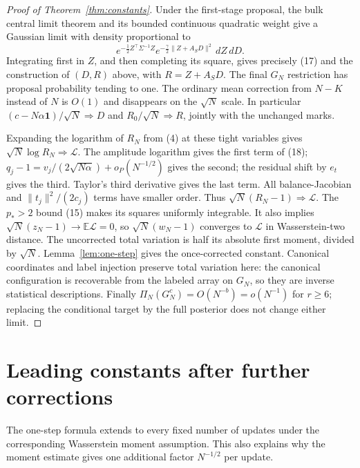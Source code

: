 \documentclass[11pt]{article}
\newcommand{\E}{\mathbb E}\newcommand{\R}{\mathbb R}
\begin{document}
\begin{proof}[Proof of Theorem~\ref{thm:constants}]
Under the first-stage proposal, the bulk central limit theorem and its
bounded continuous quadratic weight give a Gaussian limit with density
proportional to
\[
 e^{-\frac12 Z^\top\Sigma^{-1}Z}
 e^{-\frac\gamma2\|Z+A_SD\|^2}\,dZ\,dD.
\]
Integrating first in $Z$, and then completing its square, gives precisely
(17) and the construction of $(D,R)$ above, with $R=Z+A_SD$.
The final $G_N$ restriction has proposal probability tending to one.
The ordinary mean correction from $N-K$ instead of $N$ is $O(1)$ and
disappears on the $\sqrt N$ scale. In particular
$(c-N\alpha\mathbf1)/\sqrt N\Rightarrow D$ and
$R_0/\sqrt N\Rightarrow R$, jointly with the unchanged marks.

Expanding the logarithm of $R_N$ from (4) at these tight variables gives
$\sqrt N\log R_N\Rightarrow\mathcal L$. The amplitude logarithm gives
the first term of (18); $q_j-1=v_j/(2\sqrt{N\alpha})+o_P(N^{-1/2})$
gives the second; the residual shift by $e_t$ gives the third. Taylor's
third derivative gives the last term. All balance-Jacobian and
$\|t_j\|^2/(2c_j)$ terms have smaller order.
Thus $\sqrt N(R_N-1)\Rightarrow\mathcal L$. The $p_*>2$ bound (15)
makes its squares uniformly integrable. It also implies
$\sqrt N(z_N-1)\to\E\mathcal L=0$, so
$\sqrt N(w_N-1)$ converges to $\mathcal L$ in Wasserstein-two distance.
The uncorrected total variation is half its absolute first moment,
divided by $\sqrt N$. Lemma~\ref{lem:one-step} gives the once-corrected
constant. Canonical coordinates and label injection preserve total
variation here: the canonical configuration is recoverable from the
labeled array on $G_N$, so they are inverse statistical descriptions.
Finally $\Pi_N(G_N^c)=O(N^{-b})=o(N^{-1})$ for $r\ge6$; replacing the
conditional target by the full posterior does not change either limit.
\end{proof}

\section{Leading constants after further corrections}
The one-step formula extends to every fixed number of updates under the
corresponding Wasserstein moment assumption. This also explains why the
moment estimate gives one additional factor $N^{-1/2}$ per update.
\end{document}
